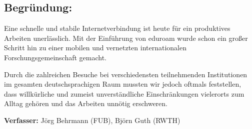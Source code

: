 \documentclass[12pt,oneside]{scrartcl}
\begin{document}
\subsection*{Begründung:}

Eine schnelle und stabile Internetverbindung ist heute für ein produktives
Arbeiten unerlässlich. Mit der Einführung von eduroam wurde schon ein großer
Schritt hin zu einer mobilen und vernetzten internationalen
Forschungsgemeinschaft gemacht.

Durch die zahlreichen Besuche bei verschiedensten teilnehmenden Institutionen im
gesamten deutschsprachigen Raum mussten wir jedoch oftmals feststellen, dass
willkürliche und zumeist unverständliche Einschränkungen vielerorts zum Alltag
gehören und das Arbeiten unnötig erschweren.


\vspace{1cm}
\textbf{Verfasser:} Jörg Behrmann (FUB), Björn Guth (RWTH)
\end{document}
